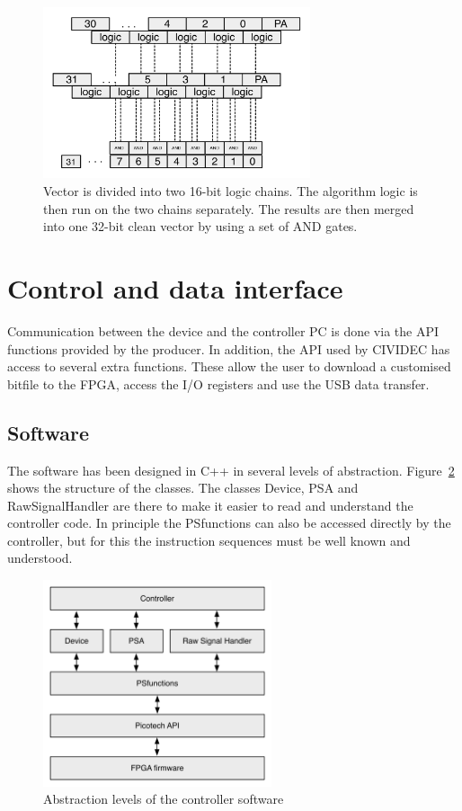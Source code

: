 \begin{figure}[!t]
\centering
\includegraphics[width=0.7\textwidth]{05_current_monitoring/plots/algobase}
\caption{Vector is divided into two 16-bit logic chains. The algorithm logic is then run on the two chains separately. The results are then merged into one 32-bit clean vector by using a set of AND gates.}
\label{fig:algobase}
\end{figure}


\section{Control and data interface}
Communication between the device and the controller PC is done via the API functions provided by the producer. In addition, the API used by CIVIDEC has access to several extra functions. These allow the user to download a customised bitfile to the FPGA, access the I/O registers and use the USB data transfer.

\subsection{Software}
The software has been designed in C++ in several levels of abstraction. Figure~\ref{fig:controller} shows the structure of the classes. The classes Device, PSA and RawSignalHandler are there to make it easier to read and understand the controller code. In principle the PSfunctions can also be accessed directly by the controller, but for this the instruction sequences must be well known and understood. 

\begin{figure}[!t]
\centering
\includegraphics[width=0.6\textwidth]{05_current_monitoring/plots/controller}
\caption{Abstraction levels of the controller software}
\label{fig:controller}
\end{figure}

